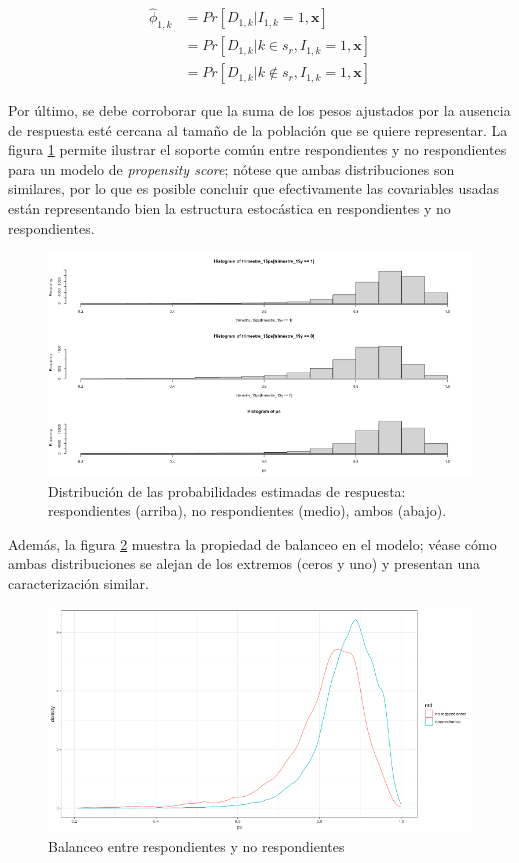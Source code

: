 \documentclass[
  12pt,
]{book}
\begin{document}
\begin{align*}
\hat\phi_{1, k} &= Pr[D_{1, k} | I_{1, k} = 1,\mathbf{x}] \\
&= Pr[D_{1, k} | k \in s_r, I_{1, k} = 1, \mathbf{x}] \\
&= Pr[D_{1, k} | k \notin s_r, I_{1, k} = 1, \mathbf{x}]
\end{align*}

Por último, se debe corroborar que la suma de los pesos ajustados por la ausencia de respuesta esté cercana al tamaño de la población que se quiere representar. La figura \ref{fig:figel3a} permite ilustrar el soporte común entre respondientes y no respondientes para un modelo de \emph{propensity score}; nótese que ambas distribuciones son similares, por lo que es posible concluir que efectivamente las covariables usadas están representando bien la estructura estocástica en respondientes y no respondientes.

\begin{figure}

{\centering \includegraphics[width=0.5\linewidth]{Pics/el3a} 

}

\caption{Distribución de las probabilidades estimadas de respuesta: respondientes (arriba), no respondientes (medio), ambos (abajo).}\label{fig:figel3a}
\end{figure}

Además, la figura \ref{fig:figel3b} muestra la propiedad de balanceo en el modelo; véase cómo ambas distribuciones se alejan de los extremos (ceros y uno) y presentan una caracterización similar.

\begin{figure}

{\centering \includegraphics[width=0.5\linewidth]{Pics/el3b} 

}

\caption{Balanceo entre respondientes y no respondientes}\label{fig:figel3b}
\end{figure}
\end{document}
